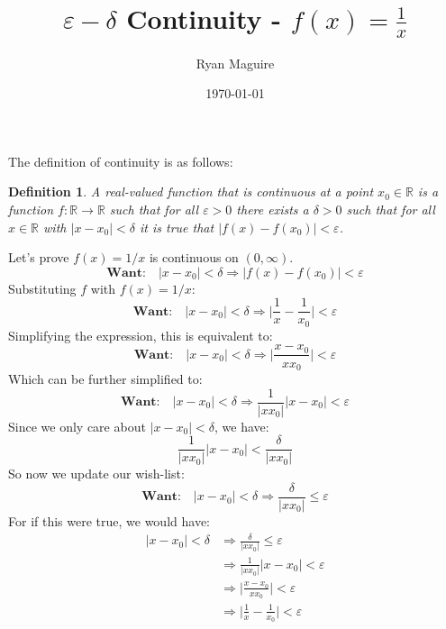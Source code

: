 \documentclass{article}
\title{$\varepsilon-\delta$ Continuity - $f(x)=\frac{1}{x}$}
\author{Ryan Maguire}
\date{\today}
\theoremstyle{normal}
\newtheorem{definition}{Definition}
\begin{document}
    \maketitle
    The definition of continuity is as follows:
    \begin{definition}
        A real-valued function that is continuous at a point
        $x_{0}\in\mathbb{R}$ is a function $f:\mathbb{R}\rightarrow\mathbb{R}$
        such that for all $\varepsilon>0$ there exists a $\delta>0$ such that
        for all $x\in\mathbb{R}$ with $|x-x_{0}|<\delta$ it is true that
        $|f(x)-f(x_{0})|<\varepsilon$.
    \end{definition}
    Let's prove $f(x)=1/x$ is continuous on $(0,\infty)$.
    \begin{equation}
        \textbf{Want:}\quad
        |x-x_{0}|<\delta
        \Rightarrow
        |f(x)-f(x_{0})|<\varepsilon
    \end{equation}
    Substituting $f$ with $f(x)=1/x$:
    \begin{equation}
        \textbf{Want:}\quad
        |x-x_{0}|<\delta
        \Rightarrow
        \big|\frac{1}{x}-\frac{1}{x_{0}}\big|<\varepsilon
    \end{equation}
    Simplifying the expression, this is equivalent to:
    \begin{equation}
        \textbf{Want:}\quad
        |x-x_{0}|<\delta
        \Rightarrow
        \big|\frac{x-x_{0}}{xx_{0}}\big|<\varepsilon
    \end{equation}
    Which can be further simplified to:
    \begin{equation}
        \textbf{Want:}\quad
        |x-x_{0}|<\delta
        \Rightarrow
        \frac{1}{|xx_{0}|}|x-x_{0}|<\varepsilon
    \end{equation}
    Since we only care about $|x-x_{0}|<\delta$, we have:
    \begin{equation}
        \frac{1}{|xx_{0}|}|x-x_{0}|<\frac{\delta}{|xx_{0}|}
    \end{equation}
    So now we update our wish-list:
    \begin{equation}
        \textbf{Want:}\quad
        |x-x_{0}|<\delta
        \Rightarrow
        \frac{\delta}{|xx_{0}|}\leq\varepsilon
    \end{equation}
    For if this were true, we would have:
    \begin{align}
        |x-x_{0}|<\delta&\Rightarrow\frac{\delta}{|xx_{0}|}\leq\varepsilon\\
        &\Rightarrow\frac{1}{|xx_{0}|}|x-x_{0}|<\varepsilon\\
        &\Rightarrow\big|\frac{x-x_{0}}{xx_{0}}\big|<\varepsilon\\
        &\Rightarrow\big|\frac{1}{x}-\frac{1}{x_{0}}\big|<\varepsilon
    \end{align}
\end{document}
